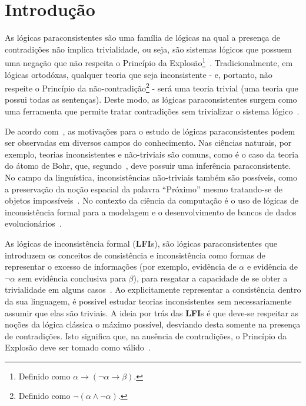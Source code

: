 \chapter{Introdução}

\noindent\label{cap:Introducao}
As lógicas paraconsistentes são uma família de lógicas na qual a presença de contradições não implica trivialidade, ou seja, são sistemas lógicos que possuem uma negação que não respeita o Princípio da Explosão\footnote{Definido como $\alpha \rightarrow (\neg \alpha \rightarrow \beta)$.}~\cite{carnielli2007}. Tradicionalmente, em lógicas ortodóxas, qualquer teoria que seja inconsistente {-} e, portanto, não respeite o Princípio da não-contradição\footnote{Definido como $\neg (\alpha \land \neg \alpha)$.} {-} será uma teoria trivial (uma teoria que possui todas as sentenças). Deste modo, as lógicas paraconsistentes surgem como uma ferramenta que permite tratar contradições sem trivializar o sistema lógico~\cite{Carnielli_Coniglio_2016}.

De acordo com~\cite{sep-logic-paraconsistent}, as motivações para o estudo de lógicas paraconsistentes podem ser observadas em diversos campos do conhecimento. Nas ciências naturais, por exemplo, teorias inconsistentes e não-triviais são comuns, como é o caso da teoria do átomo de Bohr, que, segundo~\cite{Brown2015-BROCAP-9}, deve possuir uma inferência paraconsistente. No campo da linguística, inconsistências não-triviais também são possíveis, como a preservação da noção espacial da palavra ``Próximo'' mesmo tratando-se de objetos impossíveis~\cite{McGinnis2013-MCGTUA}. No contexto da ciência da computação é o uso de lógicas de inconsistência formal para a modelagem e o desenvolvimento de bancos de dados evolucionários~\cite{carnielli2000formal}.

As lógicas de inconsistência formal (\textbf{LFI}s), são lógicas paraconsistentes que introduzem os conceitos de consistência e inconsistência como formas de representar o excesso de informações (por exemplo, evidência de $\alpha$ e evidência de $\neg \alpha$ sem evidência conclusiva para $\beta$), para resgatar a capacidade de se obter a trivialidade em alguns casos~\cite{carnielli2007}. Ao explicitamente representar a consistência dentro da sua linguagem, é possivel estudar teorias inconsistentes sem necessariamente assumir que elas são triviais. A ideia por trás das \textbf{LFI}s é que deve-se respeitar as noções da lógica clássica o máximo possível, desviando desta somente na presença de contradições. Isto significa que, na ausência de contradições, o Princípio da Explosão deve ser tomado como válido~\cite{sep-logic-paraconsistent}.



